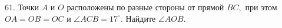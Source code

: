 61. Точки $A$ и $O$ расположены по разные стороны от прямой $BC,$ при этом  $OA=OB=OC$ и $\angle ACB= 17  ^\circ.$ Найдите $\angle AOB.$\\
